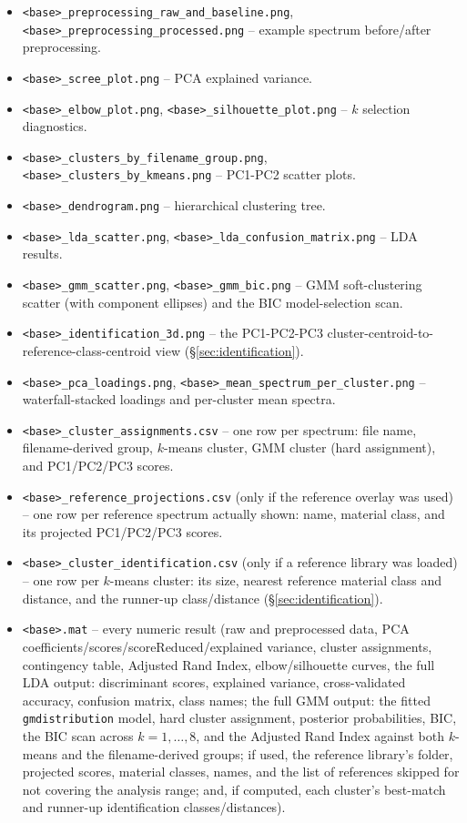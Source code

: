 \documentclass[11pt,a4paper]{article}
\newcommand{\code}[1]{\texttt{#1}}
\begin{document}
\begin{itemize}
  \item \code{<base>\_preprocessing\_raw\_and\_baseline.png},
  \code{<base>\_preprocessing\_processed.png} -- example spectrum
  before/after preprocessing.
  \item \code{<base>\_scree\_plot.png} -- PCA explained variance.
  \item \code{<base>\_elbow\_plot.png}, \code{<base>\_silhouette\_plot.png}
  -- $k$ selection diagnostics.
  \item \code{<base>\_clusters\_by\_filename\_group.png},
  \code{<base>\_clusters\_by\_kmeans.png} -- PC1-PC2 scatter plots.
  \item \code{<base>\_dendrogram.png} -- hierarchical clustering tree.
  \item \code{<base>\_lda\_scatter.png}, \code{<base>\_lda\_confusion\_matrix.png}
  -- LDA results.
  \item \code{<base>\_gmm\_scatter.png}, \code{<base>\_gmm\_bic.png} -- GMM
  soft-clustering scatter (with component ellipses) and the BIC
  model-selection scan.
  \item \code{<base>\_identification\_3d.png} -- the PC1-PC2-PC3
  cluster-centroid-to-reference-class-centroid view (\S\ref{sec:identification}).
  \item \code{<base>\_pca\_loadings.png}, \code{<base>\_mean\_spectrum\_per\_cluster.png}
  -- waterfall-stacked loadings and per-cluster mean spectra.
  \item \code{<base>\_cluster\_assignments.csv} -- one row per spectrum:
  file name, filename-derived group, $k$-means cluster, GMM cluster (hard
  assignment), and PC1/PC2/PC3 scores.
  \item \code{<base>\_reference\_projections.csv} (only if the reference
  overlay was used) -- one row per reference spectrum actually shown:
  name, material class, and its projected PC1/PC2/PC3 scores.
  \item \code{<base>\_cluster\_identification.csv} (only if a reference
  library was loaded) -- one row per $k$-means cluster: its size, nearest
  reference material class and distance, and the runner-up class/distance
  (\S\ref{sec:identification}).
  \item \code{<base>.mat} -- every numeric result (raw and
  preprocessed data, PCA coefficients/scores/scoreReduced/explained
  variance, cluster assignments, contingency table, Adjusted Rand Index, elbow/silhouette
  curves, the full LDA output: discriminant scores, explained variance,
  cross-validated accuracy, confusion matrix, class names; the full GMM
  output: the fitted \code{gmdistribution} model, hard cluster assignment,
  posterior probabilities, BIC, the BIC scan across $k=1,\dots,8$, and the
  Adjusted Rand Index against both $k$-means and the filename-derived
  groups; if used, the reference library's folder, projected scores,
  material classes, names, and the list of references skipped for not
  covering the analysis range; and, if computed, each cluster's best-match
  and runner-up identification classes/distances).
\end{itemize}
\end{document}
